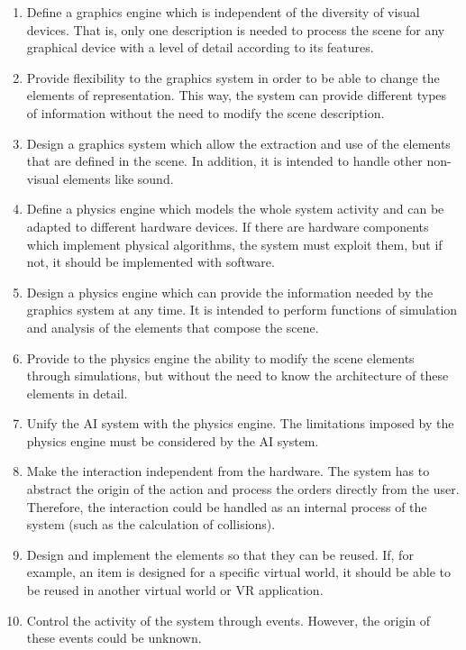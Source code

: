 \begin{enumerate}
    \item Define a graphics engine which is independent of the diversity of visual
devices. That is, only one description is needed to process the scene for any graphical device with
a level of detail according to its features.

    \item Provide flexibility to the graphics system in order to be
able to change the elements of representation. This way, the system can
provide different types of information without the need to modify the scene
description.

    \item Design a graphics system which allow the extraction and use of the
elements that are defined in the scene. In addition, it is intended to handle other non-visual
elements like sound.

    \item Define a physics engine which models the whole system activity
and can be adapted to different hardware devices. If there are hardware components which implement
physical algorithms, the system must exploit them, but if not, it should be implemented with
software.

    \item Design a physics engine which can provide the information needed by the graphics system at any time. It is intended to perform functions of simulation and analysis of the elements that compose the scene.

    \item Provide to the physics engine the ability to modify the scene
elements through simulations, but without the need to know the architecture of these elements in
detail.

    \item Unify the AI system with the physics engine. The limitations
imposed by the physics engine must be considered by the AI system.

    \item Make the interaction independent from the hardware. The system has to abstract the origin of the action and process the orders directly from the user. Therefore, the interaction could be handled as an internal process of the system (such as the calculation of collisions).

    \item Design and implement the elements so that they can be reused. If, for
example, an item is designed for a specific virtual world, it should be able to
be reused in another virtual world or VR application.

    \item Control the activity of the system through events. However, the origin of these events could be unknown.

\end{enumerate}


